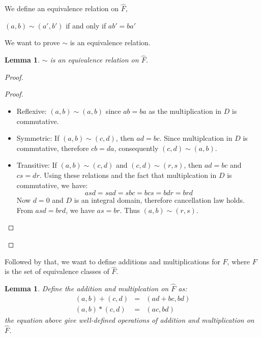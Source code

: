 \documentclass{article}
\theoremstyle{MyNonumberplain}
\theoremstyle{break}
\newtheorem*{proof}{Proof. }
\theoremstyle{break}
\newtheorem{lemma}[theorem]{Lemma}
\theoremstyle{break}
\theoremstyle{definition}
\theoremstyle{break}
\begin{document}
We define an equivalence relation on $\hat{F}$,

\begin{center}
    $(a, b) \sim (a', b')$ if and only if $a b' = b a'$
\end{center}

We want to prove $\sim$ is an equivalence relation.

\begin{thmbox}
    \begin{lemma}
        $\sim$ is an equivalence relation on $\hat{F}$.
    \end{lemma}
    \begin{prfbox}
        \begin{proof}
            \begin{proof}
                \begin{itemize}
                    \item Reflexive: $(a, b) \sim (a, b)$ since $ab = ba$ as the
                    multiplication in $D$ is commutative.\bigskip
                    
                    \item Symmetric: If $(a, b) \sim (c, d)$, then $ad = bc$.
                    Since multiplcation in $D$ is commutative, therefore $cb =
                    da$, consequently $(c, d) \sim (a, b)$.\bigskip
                    
                    \item Transitive: If $(a, b) \sim (c, d)$ and $(c, d) \sim (r, s)$, then
                    $ad = bc$ and $cs = dr$. Using these relations
                    and the fact that multiplcation in $D$ is commutative, we have:
                    \[ asd = sad = sbc = bcs = bdr =
                       brd \]
                    Now $d = 0$ and $D$ is an integral domain, therefore cancellation law holds.
                    From $asd = brd$, we have $as = br$. Thus $(a,
                    b) \sim (r, s)$.
                  \end{itemize}
            \end{proof}
            
        \end{proof}
    \end{prfbox}
\end{thmbox}

Followed by that, we want to define additions and multiplications for $F$, where $F$ is the set of equivalence classes of $\hat{F}$.
\begin{thmbox}
    \begin{lemma}
            Define the addition and multiplcation on $\hat{F}$ as:
            \begin{eqnarray*}
                (a,b)+(c,d) & = & (ad+bc,bd)\\
                (a,b)*(c,d) & = & (ac,bd)
            \end{eqnarray*}
            the equation above give well-defined operations of addition and multiplication on $\hat{F}$.
    \end{lemma}
\end{thmbox}
\end{document}
